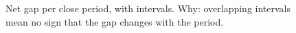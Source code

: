\begin{figure}[H]
\centering
{}
\caption{Net gap per close period, with \CiLevel{} intervals. Why: overlapping intervals mean no sign that the gap changes with the period.}%
\label{fig:r3-peer-b}
\end{figure}
